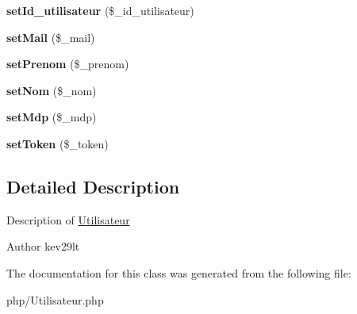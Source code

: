 \begin{DoxyCompactItemize}
{\bfseries set\+Id\+\_\+utilisateur} (\$\+\_\+id\+\_\+utilisateur)
\item 
\mbox{\label{class_utilisateur_a3a05c2f27633b11b447cdaff240f9551}} 
{\bfseries set\+Mail} (\$\+\_\+mail)
\item 
\mbox{\label{class_utilisateur_a15debc4cd168eeddc89a19a4b83356ef}} 
{\bfseries set\+Prenom} (\$\+\_\+prenom)
\item 
\mbox{\label{class_utilisateur_aafe56564a4593df7cd5630b89f635697}} 
{\bfseries set\+Nom} (\$\+\_\+nom)
\item 
\mbox{\label{class_utilisateur_aca74d0922d4c9e5175c89a07d66e1648}} 
{\bfseries set\+Mdp} (\$\+\_\+mdp)
\item 
\mbox{\label{class_utilisateur_a6cf653bccdb13ed7bfb9ec234e12b3b5}} 
{\bfseries set\+Token} (\$\+\_\+token)
\end{DoxyCompactItemize}


\subsection{Detailed Description}
Description of \mbox{\hyperlink{class_utilisateur}{Utilisateur}}

\begin{DoxyAuthor}{Author}
kev29lt 
\end{DoxyAuthor}


The documentation for this class was generated from the following file\+:\begin{DoxyCompactItemize}
\item 
php/Utilisateur.\+php\end{DoxyCompactItemize}

